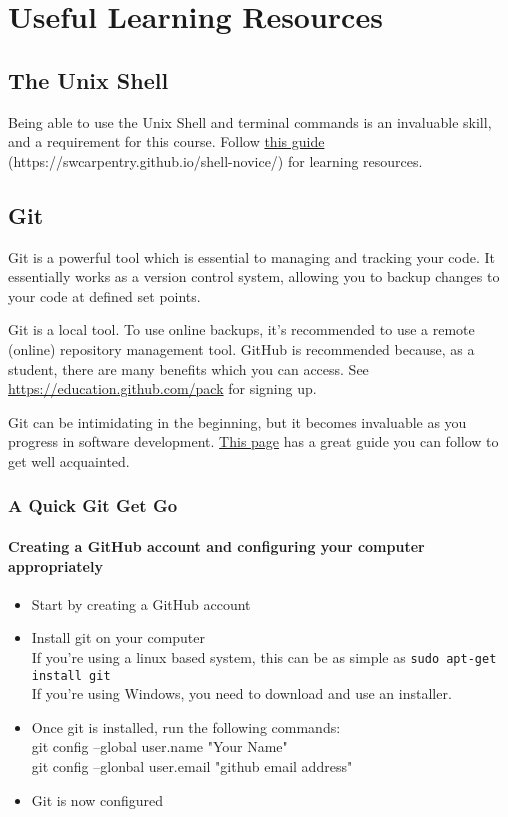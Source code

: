 \section{Useful Learning Resources}
\subsection{The Unix Shell}
Being able to use the Unix Shell and terminal commands is an invaluable skill, and a requirement for this course. Follow \href{https://swcarpentry.github.io/shell-novice/}{this guide} (https://swcarpentry.github.io/shell-novice/) for learning resources.

\subsection{Git}
\label{app:Git}
Git is a powerful tool which is essential to managing and tracking your code. It essentially works as a version control system, allowing you to backup changes to your code at defined set points.

Git is a local tool. To use online backups, it's recommended to use a remote (online) repository management tool. GitHub is recommended because, as a student, there are many benefits which you can access. See \href{https://education.github.com/pack}{https://education.github.com/pack} for signing up.

Git can be intimidating in the beginning, but it becomes invaluable as you progress in software development. \href{https://swcarpentry.github.io/git-novice/}{This page} has a great guide you can follow to get well acquainted.

\subsubsection{A Quick Git Get Go}
\paragraph{Creating a GitHub account and configuring your computer appropriately}
\begin{itemize}
    \item Start by creating a GitHub account
    \item Install git on your computer\\
    If you're using a linux based system, this can be as simple as \verb|sudo apt-get install git|\\
    If you're using Windows, you need to download and use an installer.
    \item Once git is installed, run the following commands:\\
    git config --global user.name "Your Name"\\
    git config --glonbal user.email "github email address"
    \item Git is now configured
\end{itemize}

